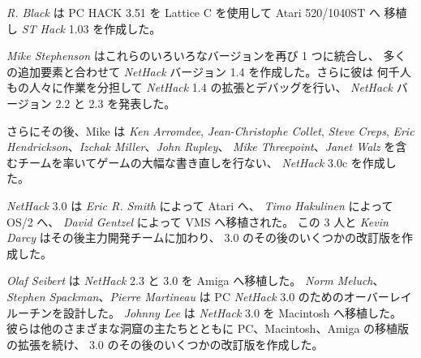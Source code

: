 \medskip
{\it R. Black} は PC HACK 3.51 を Lattice C を使用して Atari 520/1040ST へ
移植し {\it ST Hack\/} 1.03 を作成した。

\medskip
{\it Mike Stephenson} はこれらのいろいろなバージョンを再び 1 つに統合し、
多くの追加要素と合わせて {\it NetHack\/} バージョン 1.4 を作成した。さらに彼は
何千人もの人々に作業を分担して {\it NetHack\/} 1.4 の拡張とデバッグを行い、
{\it NetHack\/} バージョン 2.2 と 2.3 を発表した。

\medskip
さらにその後、Mike は {\it Ken Arromdee}, {\it Jean-Christophe Collet},
{\it Steve Creps}, {\it Eric Hendrickson}、{\it Izchak Miller}、{\it John Rupley}、
{\it Mike Threepoint}、{\it Janet Walz} 
を含むチームを率いてゲームの大幅な書き直しを行ない、
{\it NetHack\/} 3.0c を作成した。

\medskip
{\it NetHack\/} 3.0 は {\it Eric R. Smith} によって Atari へ、
{\it Timo Hakulinen} によって OS/2 へ、
{\it David Gentzel} によって VMS へ移植された。
この 3 人と {\it Kevin Darcy} はその後主力開発チームに加わり、
3.0 のその後のいくつかの改訂版を作成した。

\medskip
{\it Olaf Seibert} は {\it NetHack\/} 2.3 と 3.0 を Amiga へ移植した。
{\it Norm Meluch}、{\it Stephen Spackman}、{\it Pierre Martineau} は
PC {\it NetHack\/} 3.0 のためのオーバーレイルーチンを設計した。
{\it Johnny Lee} は {\it NetHack\/} 3.0 を Macintosh へ移植した。
彼らは他のさまざまな洞窟の主たちとともに PC、Macintosh、Amiga 
の移植版の拡張を続け、 3.0 のその後のいくつかの改訂版を作成した。

